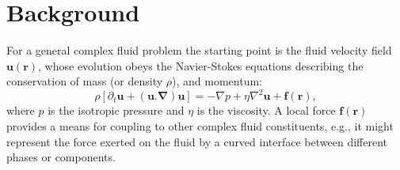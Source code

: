 \section{Background}\label{ch14:sec:background}   



For a general complex fluid problem the starting point is the
fluid velocity field $\mathbf{u}(\mathbf{r})$, whose evolution
obeys the Navier-Stokes equations describing the conservation of mass
(or density $\rho$), and momentum:
\begin{equation}
\rho  [ \partial_t \mathbf{u} + (\mathbf{u}.\mathbf{\nabla})\mathbf{u} ]
= -\nabla p + \eta \nabla^2 \mathbf{u} + \mathbf{f}(\mathbf{r}),
\end{equation}
where $p$ is the isotropic pressure and $\eta$ is the viscosity.
A local force $\mathbf{f}(\mathbf{r})$ provides a means for coupling
to other complex fluid constituents, e.g., it might represent the force
exerted on the fluid by a curved interface between different phases or
components.

